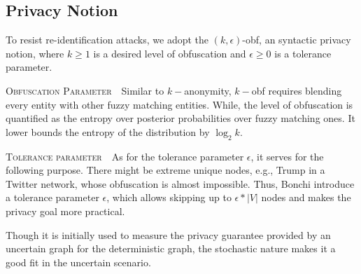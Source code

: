 \vspace{-4pt}
\subsection{Privacy Notion}
\label{sec:privacyNotion}
To resist re-identification attacks, we adopt the $(k,\epsilon)$-obf, an syntactic privacy notion,
 where $k \ge 1$ is a desired level of obfuscation  and $\epsilon \ge 0$ is a tolerance parameter. 

\textsc{Obfuscation Parameter}~~Similar to $k-$anonymity, $k-$obf requires blending every entity with other fuzzy matching entities. While, the level of obfuscation is quantified as the entropy over posterior probabilities over fuzzy matching ones. It lower bounds the entropy of the distribution by $\log_{2} k$. 

\textsc{Tolerance parameter}~~As for the tolerance parameter $\epsilon$, it serves for the following purpose. There might be extreme unique nodes, e.g., Trump in a Twitter network, whose obfuscation is almost impossible. Thus, Bonchi {\etal} introduce a tolerance parameter $\epsilon$, which allows skipping up to $\epsilon * |V|$ nodes and makes the privacy goal more practical. 

Though it is initially used to measure the privacy guarantee provided by an uncertain graph for the  deterministic graph, the stochastic nature makes it a good fit in the uncertain scenario. 
\vspace{-17pt}
